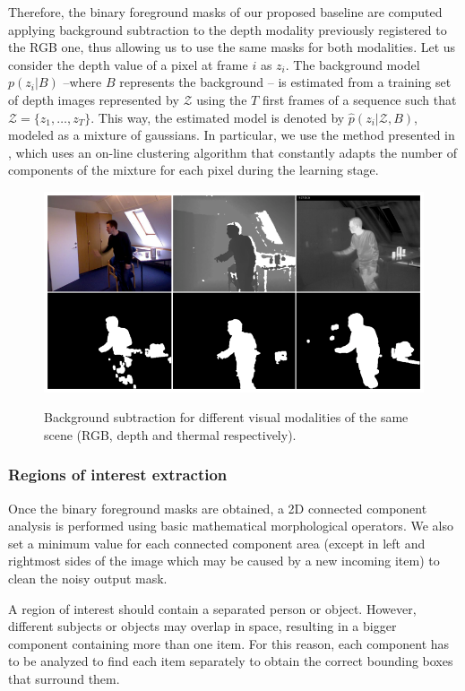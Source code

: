\documentclass[10pt,twocolumn,letterpaper]{article}
\begin{document}
Therefore, the binary foreground masks of our proposed baseline are computed applying background subtraction to the depth modality previously registered to the RGB one, thus allowing us to use the same masks for both modalities.  Let us consider the depth value of a pixel at frame $i$ as $z_i$. The background model $p(z_i|B)$ --where $B$ represents the background -- is estimated from a training set of depth images represented by $\mathcal{Z}$ using the $T$ first frames of a sequence such that $\mathcal{Z} = \{z_1, \ldots, z_T\}$. This way, the estimated model is denoted by $\hat{p}(z_i| \mathcal{Z}, B)$, modeled as a mixture of gaussians. In particular, we use the method presented in \cite{zivkovic2004improved}, which uses an on-line clustering algorithm that constantly adapts the number of components of the mixture for each pixel during the learning stage. 

 \begin{figure}[!h]
{\includegraphics[width=\linewidth]{bs.eps}}
\caption{Background subtraction for different visual
modalities of the same scene (RGB, depth and thermal respectively).
\label{fig:bscomparison}}
\end{figure}

\subsubsection{Regions of interest extraction}
\label{sssec:extreg}
Once the binary foreground masks are obtained, a 2D connected component analysis is performed using basic mathematical morphological operators. We also set a minimum value for each connected component area (except in left and rightmost sides of the image which may be caused by a new incoming item) to clean the noisy output mask. 

A region of interest should contain a separated person or object. However, different subjects or objects may overlap in space, resulting in a bigger component containing more than one item. For this reason, each component has to be analyzed to find each item separately to obtain the correct bounding boxes that surround them.
\end{document}
